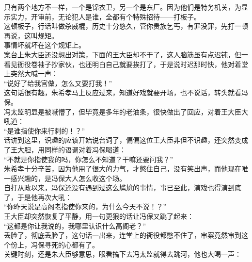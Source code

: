 \begin{multicols}{\theparacolNo}
只有两个地方不一样，一个是锦衣卫，另一个是东厂。因为他们是特务机关，为显示实力，开审前，无论犯人是谁，全都有个特殊招待——打板子。\\

这顿板子，行话叫做杀威棍，历史十分悠久，管你贵族乞丐，有罪没罪，先打一顿再说，这叫规矩。\\

事情坏就坏在这个规矩上。\\

案台上朱大臣还没想出对策，下面的王大臣却不干了，这人脑筋虽有点迟钝，但一看见衙役卷袖子抄家伙，也还明白自己就要挨打了，于是说时迟那时快，他对着堂上突然大喊一声：\\

“说好了给我官做，怎么又要打我！”\\

这句话很有趣，朱希孝马上反应过来，知道好戏就要开场，也不说话，转头就看冯保。\\

冯太监明显是被喊懵了，但毕竟是多年的老油条，很快做出了回应，对着王大臣大吼道：\\

“是谁指使你来行刺的！？”\\

话讲到这里，识趣的应该开始说台词了，偏偏这位王大臣非但不识趣，还突然变成了王大胆，用同样的语调对着冯保喝道：\\

“不就是你指使我的吗，你怎么不知道？干嘛还要问我？”\\

朱希孝十分辛苦，因为他用了很大的力气，才憋住自己，没有笑出声，而他现在唯一感兴趣的，是冯保大人怎么收这个场。\\

自打从政以来，冯保还没有遇到过这么尴尬的事情，事已至此，演戏也得演到底了，于是他再次大吼：\\

“你昨天说是高阁老指使你来的，为什么今天不说！？”\\

王大臣却突然恢复了平静，用一句更狠的话让冯保又跳了起来：\\

“这都是你让我说的，我哪里认识什么高阁老？”\\

丢脸了，彻底丢脸了，这句话一出来，连堂上的衙役都憋不住了，审案竟然审到这个份上，冯保寻死的心都有了。\\

关键时刻，还是朱大臣够意思，眼看搞下去冯太监就得去跳河，他也大喝一声：\\


\end{multicols}
